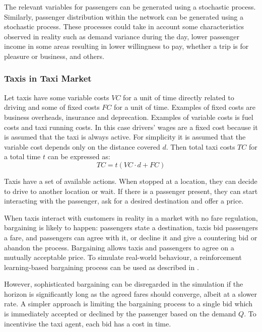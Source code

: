 The relevant variables for passengers can be generated using a stochastic
process. Similarly, passenger distribution within the network can be generated
using a stochastic process. These processes could take in account some
characteristics observed in reality such as demand variance during the day,
lower passenger income in some areas resulting in lower willingness to pay,
whether a trip is for pleasure or business, and others.


\subsubsection{Taxis in Taxi Market}
\label{sec:design:taxi}

Let taxis have some variable costs \(VC\) for a unit of time directly related
to driving and some of fixed costs \(FC\) for a unit of time. Examples of fixed
costs are business overheads, insurance and deprecation. Examples of variable
costs is fuel costs and taxi running costs. In this case drivers' wages are a
fixed cost because it is assumed that the taxi is always active. For simplicity
it is assumed that the variable cost depends only on the distance covered
\(d\). Then total taxi costs \(TC\) for a total time \(t\) can be expressed as:
\[ TC = t(VC\cdot d + FC) \]

Taxis have a set of available actions. When stopped at a location, they can
decide to drive to another location or wait. If there is a passenger present,
they can start interacting with the passenger, ask for a desired destination
and offer a price.

When taxis interact with customers in reality in a market with no fare
regulation, bargaining is likely to happen: passengers state a destination,
taxis bid passengers a fare, and passengers can agree with it, or decline it
and give a countering bid or abandon the process. Bargaining allows taxis and
passengers to agree on a mutually acceptable price. To simulate real-world
behaviour, a reinforcement learning-based bargaining process can be used as
described in \textcite{Cli1997taxi+bargaining}.

However, sophisticated bargaining can be disregarded in the simulation if the
horizon is significantly long as the agreed fares should converge, albeit at a
slower rate. A simpler approach is limiting the bargaining process to a single
bid which is immediately accepted or declined by the passenger based on the
demand \(Q\). To incentivise the taxi agent, each bid has a cost in time.


